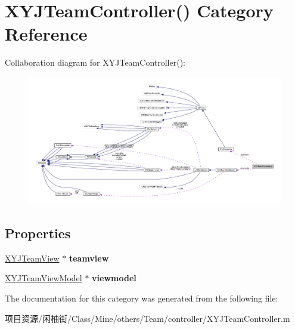 \hypertarget{category_x_y_j_team_controller_07_08}{}\section{X\+Y\+J\+Team\+Controller() Category Reference}
\label{category_x_y_j_team_controller_07_08}


Collaboration diagram for X\+Y\+J\+Team\+Controller()\+:\nopagebreak
\begin{figure}[H]
\begin{center}
\leavevmode
\includegraphics[width=350pt]{category_x_y_j_team_controller_07_08__coll__graph}
\end{center}
\end{figure}
\subsection*{Properties}
\begin{DoxyCompactItemize}
\item 
\mbox{\label{category_x_y_j_team_controller_07_08_a323f55f321041ae800d9ce44a1740109}} 
\mbox{\hyperlink{interface_x_y_j_team_view}{X\+Y\+J\+Team\+View}} $\ast$ {\bfseries teamview}
\item 
\mbox{\label{category_x_y_j_team_controller_07_08_a40390597b55a94b7e7337d2cd7495650}} 
\mbox{\hyperlink{interface_x_y_j_team_view_model}{X\+Y\+J\+Team\+View\+Model}} $\ast$ {\bfseries viewmodel}
\end{DoxyCompactItemize}


The documentation for this category was generated from the following file\+:\begin{DoxyCompactItemize}
\item 
项目资源/闲柚街/\+Class/\+Mine/others/\+Team/controller/X\+Y\+J\+Team\+Controller.\+m\end{DoxyCompactItemize}
